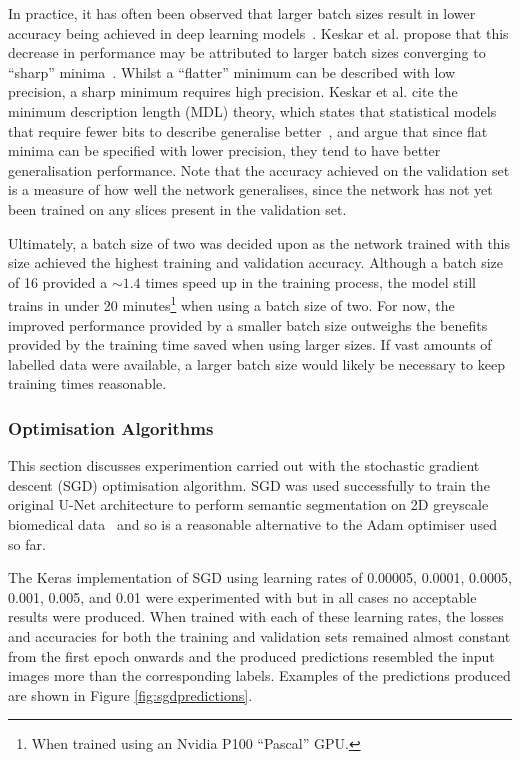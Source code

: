 In practice, it has often been observed that larger batch sizes result in lower accuracy being achieved in deep learning models~\cite{keskar2016large, smallbatch, largebatch}. Keskar et al. propose that this decrease in performance may be attributed to larger batch sizes converging to ``sharp'' minima~\cite{keskar2016large}. Whilst a ``flatter'' minimum can be described with low precision, a sharp minimum requires high precision. Keskar et al. cite the minimum description length (MDL) theory, which states that statistical models that require fewer bits to describe generalise better~\cite{rissanen}, and argue that since flat minima can be specified with lower precision, they tend to have better generalisation performance. Note that the accuracy achieved on the validation set is a measure of how well the network generalises, since the network has not yet been trained on any slices present in the validation set.

Ultimately, a batch size of two was decided upon as the network trained with this size achieved the highest training and validation accuracy. Although a batch size of 16 provided a ${\sim}1.4$ times speed up in the training process, the model still trains in under 20 minutes\footnote{When trained using an Nvidia P100 ``Pascal'' GPU.} when using a batch size of two. For now, the improved performance provided by a smaller batch size outweighs the benefits provided by the training time saved when using larger sizes. If vast amounts of labelled data were available, a larger batch size would likely be necessary to keep training times reasonable.

\subsubsection{Optimisation Algorithms}

This section discusses experimention carried out with the stochastic gradient descent (SGD) optimisation algorithm. SGD was used successfully to train the original U-Net architecture to perform semantic segmentation on 2D greyscale biomedical data~\cite{ronneberger2015u} and so is a reasonable alternative to the Adam optimiser used so far.

The Keras implementation of SGD using learning rates of 0.00005, 0.0001, 0.0005, 0.001, 0.005, and 0.01 were experimented with but in all cases no acceptable results were produced. When trained with each of these learning rates, the losses and accuracies for both the training and validation sets remained almost constant from the first epoch onwards and the produced predictions resembled the input images more than the corresponding labels. Examples of the predictions produced are shown in Figure \ref{fig:sgdpredictions}.

